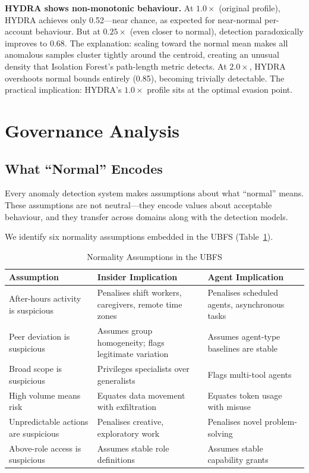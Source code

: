 \documentclass[conference]{IEEEtran}
\begin{document}
\textbf{HYDRA shows non-monotonic behaviour.} At $1.0\times$ (original profile), HYDRA achieves only 0.52---near chance, as expected for near-normal per-account behaviour. But at $0.25\times$ (even closer to normal), detection paradoxically improves to 0.68. The explanation: scaling toward the normal mean makes all anomalous samples cluster tightly around the centroid, creating an unusual density that Isolation Forest's path-length metric detects. At $2.0\times$, HYDRA overshoots normal bounds entirely (0.85), becoming trivially detectable. The practical implication: HYDRA's $1.0\times$ profile sits at the optimal evasion point.

\section{Governance Analysis}
\label{sec:governance}

\subsection{What ``Normal'' Encodes}
\label{sec:assumptions}

Every anomaly detection system makes assumptions about what ``normal'' means. These assumptions are not neutral---they encode values about acceptable behaviour, and they transfer across domains along with the detection models.

We identify six normality assumptions embedded in the UBFS (Table~\ref{tab:assumptions}).

\begin{table}[htbp]
\caption{Normality Assumptions in the UBFS}
\label{tab:assumptions}
\centering
\small
\begin{tabular}{p{1.8cm}p{2.6cm}p{2.6cm}}
\toprule
\textbf{Assumption} & \textbf{Insider Implication} & \textbf{Agent Implication} \\
\midrule
After-hours activity is suspicious & Penalises shift workers, caregivers, remote time zones & Penalises scheduled agents, asynchronous tasks \\
\addlinespace
Peer deviation is suspicious & Assumes group homogeneity; flags legitimate variation & Assumes agent-type baselines are stable \\
\addlinespace
Broad scope is suspicious & Privileges specialists over generalists & Flags multi-tool agents \\
\addlinespace
High volume means risk & Equates data movement with exfiltration & Equates token usage with misuse \\
\addlinespace
Unpredictable actions are suspicious & Penalises creative, exploratory work & Penalises novel problem-solving \\
\addlinespace
Above-role access is suspicious & Assumes stable role definitions & Assumes stable capability grants \\
\bottomrule
\end{tabular}
\end{table}
\end{document}

